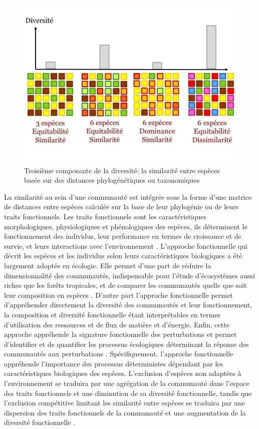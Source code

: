 \documentclass[
  11pt,
  french,
  A4paper,
  extrafontsizes,onecolumn,openright
  ]{memoir}
\begin{document}
\begin{figure}

{\centering \includegraphics[width=0.6\linewidth]{ExternalFig/Fig_RichnessEquitabilitySimilarity} 

}

\caption{Troisième composante de la diversité: la similarité entre espèces basée sur des distances phylogénétiques ou taxonomiques}\label{fig:RichEquSim}
\end{figure}

La similarité au sein d'une communauté est intégrée sous la forme d'une
matrice de distances entre espèces calculée sur la base de leur
phylogénie ou de leurs traits fonctionnels. Les traits fonctionnels sont
les caractéristiques morphologiques, physiologiques et phénologiques des
espèces, ils déterminent le fonctionnement des individus, leur
performance en termes de croissance et de survie, et leurs interactions
avec l'environnement \autocite{Violle2007b}. L'approche fonctionnelle
qui décrit les espèces et les individus selon leurs caractéristiques
biologiques a été largement adoptée en écologie. Elle permet d'une part
de réduire la dimensionnalité des communautés, indispensable pour
l'étude d'écosystèmes aussi riches que les forêts tropicales, et de
comparer les communautés quelle que soit leur composition en espèces
\autocites{Begon2006}{Scheiter2013}{Mouillot2013a}{Sakschewski2016}.
D'autre part l'approche fonctionnelle permet d'appréhender directement
la diversité des communautés et leur fonctionnement, la composition et
diversité fonctionnelle étant interprétables en termes d'utilisation des
ressources et de flux de matière et d'énergie. Enfin, cette approche
appréhende la signature fonctionnelle des perturbations et permet
d'identifier et de quantifier les processus écologiques déterminant la
réponse des communautés aux perturbations \autocite{Funk2017}.
Spécifiquement, l'approche fonctionnelle appréhende l'importance des
processus déterministes dépendant par les caractéristiques biologiques
des espèces. L'exclusion d'espèces non adaptées à l'environnement se
traduira par une agrégation de la communauté dans l'espace des traits
fonctionnels et une diminution de sa diversité fonctionnelle, tandis que
l'exclusion compétitive limitant les similarité entre espèces se
traduira par une dispersion des traits fonctionnels de la communauté et
une augmentation de la diversité fonctionnelle
\autocites{McGill2006}{Kunstler2012}.
\end{document}
